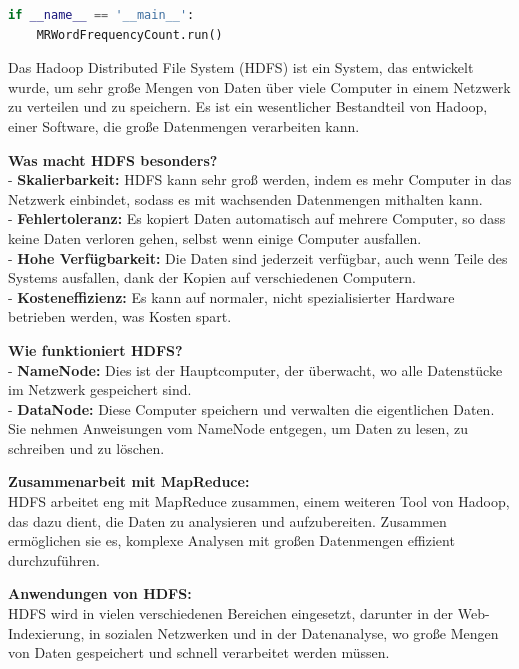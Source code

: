 \documentclass[9pt]{innovativeinnovation-cheatsheet}
\begin{document}
\begin{multicols*}{4}
\begin{lstlisting}[language=python, numbers=none]
if __name__ == '__main__':
	MRWordFrequencyCount.run()
\end{lstlisting}





Das Hadoop Distributed File System (HDFS) ist ein System, das entwickelt wurde, um sehr große Mengen von Daten über viele Computer in einem Netzwerk zu verteilen und zu speichern. Es ist ein wesentlicher Bestandteil von Hadoop, einer Software, die große Datenmengen verarbeiten kann.

\textbf{Was macht HDFS besonders?} \\
- \textbf{Skalierbarkeit:} HDFS kann sehr groß werden, indem es mehr Computer in das Netzwerk einbindet, sodass es mit wachsenden Datenmengen mithalten kann. \\
- \textbf{Fehlertoleranz:} Es kopiert Daten automatisch auf mehrere Computer, so dass keine Daten verloren gehen, selbst wenn einige Computer ausfallen. \\
- \textbf{Hohe Verfügbarkeit:} Die Daten sind jederzeit verfügbar, auch wenn Teile des Systems ausfallen, dank der Kopien auf verschiedenen Computern. \\
- \textbf{Kosteneffizienz:} Es kann auf normaler, nicht spezialisierter Hardware betrieben werden, was Kosten spart.

\textbf{Wie funktioniert HDFS?} \\
- \textbf{NameNode:} Dies ist der Hauptcomputer, der überwacht, wo alle Datenstücke im Netzwerk gespeichert sind. \\
- \textbf{DataNode:} Diese Computer speichern und verwalten die eigentlichen Daten. Sie nehmen Anweisungen vom NameNode entgegen, um Daten zu lesen, zu schreiben und zu löschen.

\textbf{Zusammenarbeit mit MapReduce:} \\
HDFS arbeitet eng mit MapReduce zusammen, einem weiteren Tool von Hadoop, das dazu dient, die Daten zu analysieren und aufzubereiten. Zusammen ermöglichen sie es, komplexe Analysen mit großen Datenmengen effizient durchzuführen.

\textbf{Anwendungen von HDFS:} \\
HDFS wird in vielen verschiedenen Bereichen eingesetzt, darunter in der Web-Indexierung, in sozialen Netzwerken und in der Datenanalyse, wo große Mengen von Daten gespeichert und schnell verarbeitet werden müssen.



\end{multicols*}
\end{document}
